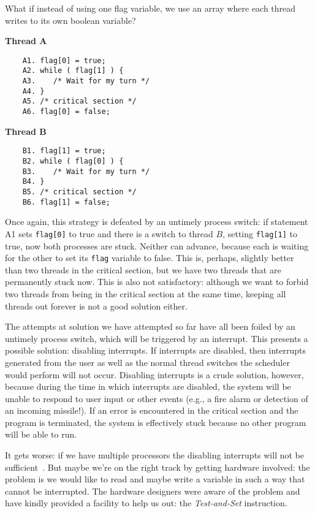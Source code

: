 What if instead of using one flag variable, we use an array where each thread writes to its own boolean variable?

\begin{multicols}{2}
\textbf{Thread A}\vspace{-2em}
	\begin{verbatim}
	A1. flag[0] = true;
	A2. while ( flag[1] ) {
	A3.    /* Wait for my turn */
	A4. }
	A5. /* critical section */
	A6. flag[0] = false;
	\end{verbatim}
\columnbreak
\textbf{Thread B}\vspace{-2em}
	\begin{verbatim}
	B1. flag[1] = true;
	B2. while ( flag[0] ) {
	B3.    /* Wait for my turn */
	B4. }
	B5. /* critical section */
	B6. flag[1] = false;
	\end{verbatim}
\end{multicols}

Once again, this strategy is defeated by an untimely process switch: if statement A1 sets \texttt{flag[0]} to true and there is a switch to thread $B$, setting \texttt{flag[1]} to true, now both processes are stuck. Neither can advance, because each is waiting for the other to set its \texttt{flag} variable to false. This is, perhaps, slightly better than two threads in the critical section, but we have two threads that are permanently stuck now. This is also not satisfactory: although we want to forbid two threads from being in the critical section at the same time, keeping all threads out forever is not a good solution either.

The attempts at solution we have attempted so far have all been foiled by an untimely process switch, which will be triggered by an interrupt. This presents a possible solution: disabling interrupts. If interrupts are disabled, then interrupts generated from the user as well as the normal thread switches the scheduler would perform will not occur. Disabling interrupts is a crude solution, however, because during the time in which interrupts are disabled, the system will be unable to respond to user input or other events (e.g., a fire alarm or detection of an incoming missile!). If an error is encountered in the critical section and the program is terminated, the system is effectively stuck because no other program will be able to run.

It gets worse: if we have multiple processors the disabling interrupts will not be sufficient~\cite{osi}. But maybe we're on the right track by getting hardware involved: the problem is we would like to read and maybe write a variable in such a way that cannot be interrupted. The hardware designers were aware of the problem and have kindly provided a facility to help us out: the \textit{Test-and-Set} instruction. 


